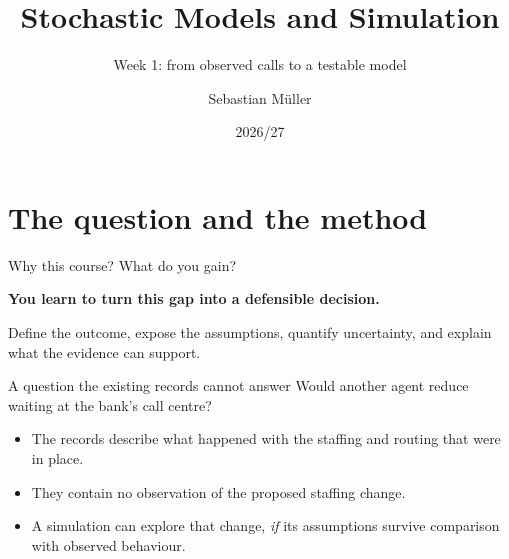 \documentclass{beamer}
\title[Stochastic Models and Simulation]{Stochastic Models and Simulation}
\subtitle{Week 1: from observed calls to a testable model}
\author{Sebastian M\"uller}
\date{2026/27}
\begin{document}
\begin{frame}
  \titlepage
\end{frame}

\section{The question and the method}

\begin{frame}{Why this course? What do you gain?}
  \centering

  \vspace{0.7em}
  \large\textbf{You learn to turn this gap into a defensible decision.}\normalsize
  \vspace{0.45em}

  \small Define the outcome, expose the assumptions, quantify uncertainty, and explain what the evidence can support.
\end{frame}

\begin{frame}{A question the existing records cannot answer}
  \large
  Would another agent reduce waiting at the bank's call centre?
  \normalsize
  \vspace{0.6em}
  \begin{itemize}
    \item The records describe what happened with the staffing and routing that were in place.
    \item They contain no observation of the proposed staffing change.
    \item A simulation can explore that change, \emph{if} its assumptions survive comparison with observed behaviour.
  \end{itemize}
\end{frame}
\end{document}
